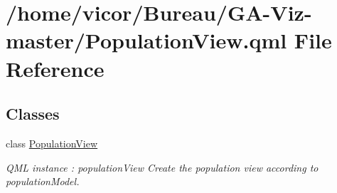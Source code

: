 \hypertarget{_population_view_8qml}{}\section{/home/vicor/\+Bureau/\+G\+A-\/\+Viz-\/master/\+Population\+View.qml File Reference}
\label{_population_view_8qml}
\subsection*{Classes}
\begin{DoxyCompactItemize}
\item 
class \hyperlink{class_population_view}{Population\+View}
\begin{DoxyCompactList}\small\item\em Q\+ML instance \+: population\+View Create the population view according to population\+Model. \end{DoxyCompactList}\end{DoxyCompactItemize}
